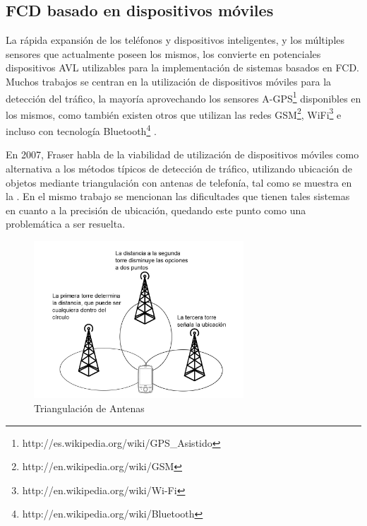 
\subsection{FCD basado en dispositivos móviles}

La rápida expansión de los teléfonos y dispositivos inteligentes, y los múltiples sensores que actualmente poseen los mismos, los convierte en potenciales dispositivos AVL utilizables para la implementación de sistemas basados en FCD. Muchos trabajos se centran en la utilización de dispositivos móviles para la detección del tráfico, la mayoría aprovechando los sensores A-GPS\footnote{http://es.wikipedia.org/wiki/GPS\_Asistido} disponibles en los mismos, como también existen otros que utilizan las redes GSM\footnote{http://en.wikipedia.org/wiki/GSM}, WiFi\footnote{http://en.wikipedia.org/wiki/Wi-Fi} e incluso con tecnología Bluetooth\footnote{http://en.wikipedia.org/wiki/Bluetooth} \cite{thiagarajan2010cooperative,thiagarajan2009vtrack,fraser2007use,fang2011enacq,ruppe2012augmenting}.

En 2007, Fraser \cite{fraser2007use} habla de la viabilidad de utilización de dispositivos móviles como alternativa a los métodos típicos de detección de tráfico, utilizando ubicación de objetos mediante triangulación con antenas de telefonía, tal como se muestra en la . En el mismo trabajo se mencionan las dificultades que tienen tales sistemas en cuanto a la precisión de ubicación, quedando este punto como una problemática a ser resuelta.

\begin{figure}[h]
	\centering
	\includegraphics[width=0.7\textwidth]{capitulos/3/figuras/figura5.jpg}
	\caption{\label{fig:triangulacionAntenas} Triangulación de Antenas}	
\end{figure}

